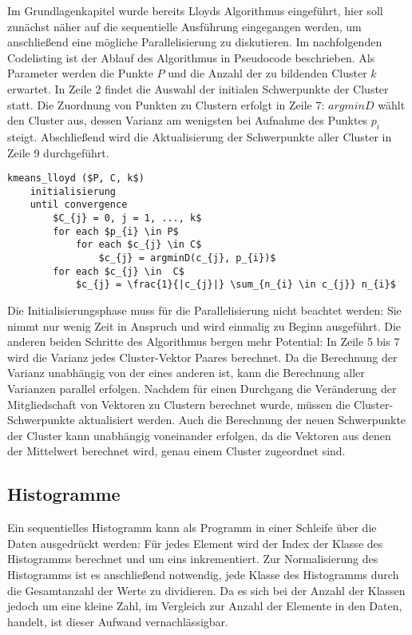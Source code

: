 Im Grundlagenkapitel wurde bereits Lloyds Algorithmus eingeführt, hier soll zunächst näher auf die sequentielle Ausführung eingegangen werden, um anschließend eine mögliche Parallelisierung zu diskutieren. Im nachfolgenden Codelisting ist der Ablauf des Algorithmus in Pseudocode beschrieben. Als Parameter werden die Punkte $P$ und die Anzahl der zu bildenden Cluster $k$ erwartet. In Zeile 2 findet die Auswahl der initialen Schwerpunkte der Cluster statt. Die Zuordnung von Punkten zu Clustern erfolgt in Zeile 7: $argminD$ wählt den Cluster aus, dessen Varianz am wenigsten bei Aufnahme des Punktes $p_{i}$ steigt. Abschließend wird die Aktualisierung der Schwerpunkte aller Cluster in Zeile 9 durchgeführt.

\lstset{language=C}
\begin{lstlisting}[mathescape=true]
kmeans_lloyd ($P, C, k$)
	initialisierung
	until convergence
		$C_{j} = 0, j = 1, ..., k$
		for each $p_{i} \in P$
			for each $c_{j} \in C$
				$c_{j} = argminD(c_{j}, p_{i})$		
		for each $c_{j} \in  C$
			$c_{j} = \frac{1}{|c_{j}|} \sum_{n_{i} \in c_{j}} n_{i}$
\end{lstlisting}

Die Initialisierungsphase muss für die Parallelisierung nicht beachtet werden: Sie nimmt nur wenig Zeit in Anspruch und wird einmalig zu Beginn ausgeführt. Die anderen beiden Schritte des Algorithmus bergen mehr Potential: In Zeile 5 bis 7 wird die Varianz jedes Cluster-Vektor Paares berechnet. Da die Berechnung der Varianz unabhängig von der eines anderen ist, kann die Berechnung aller Varianzen parallel erfolgen. Nachdem für einen Durchgang die Veränderung der Mitgliedschaft von Vektoren zu Clustern berechnet wurde, müssen die Cluster-Schwerpunkte aktualisiert werden. Auch die Berechnung der neuen Schwerpunkte der Cluster kann unabhängig voneinander erfolgen, da die Vektoren aus denen der Mittelwert berechnet wird, genau einem Cluster zugeordnet sind.


\subsection{Histogramme}

Ein sequentielles Histogramm kann als Programm in einer Schleife über die Daten ausgedrückt werden: Für jedes Element wird der Index der Klasse des Histogramms berechnet und um eins inkrementiert. Zur Normalisierung des Histogramms ist es anschließend notwendig, jede Klasse des Histogramms durch die Gesamtanzahl der Werte zu dividieren. Da es sich bei der Anzahl der Klassen jedoch um eine kleine Zahl, im Vergleich zur Anzahl der Elemente in den Daten, handelt, ist dieser Aufwand vernachlässigbar.

